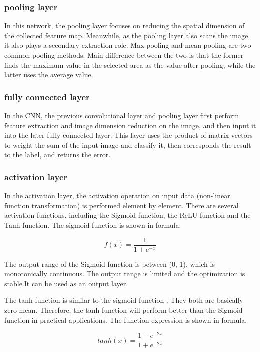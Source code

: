\subsubsection{pooling layer}
In this network, the pooling layer focuses on reducing the spatial dimension of the collected feature map. Meanwhile, as the pooling layer also scans the image, it also plays a secondary extraction role. 
Max-pooling and mean-pooling are two common pooling methods. 
Main difference between the two is that the former finds the maximum value in the selected area as the value after pooling, while the latter uses the average value.\cite{nagi2011max}

\subsubsection{fully connected layer}
In the CNN, the previous convolutional layer and pooling layer first perform feature extraction and image dimension reduction on the image, and then input it into the later fully connected layer. This layer uses the product of matrix vectors to weight the sum of the input image and classify it, then corresponds the result to the label, and returns the error.

\subsubsection{activation layer}

In the activation layer, the activation operation on input data (non-linear function transformation) is performed element by element.\cite{gomes2004comparison} There are several activation functions, including the Sigmoid function, the ReLU function and the Tanh function. The sigmoid function is shown in formula.


\begin{equation}
	f(x)=\frac{1}{1+e^{-x}}
\end{equation}	
 
The output range of the Sigmoid function is between (0, 1), which is monotonically continuous. The output range is limited  and the optimization is stable.It can be used as an output layer.


The tanh function is similar to the sigmoid function . They both are basically zero mean. Therefore, the tanh function will perform better than the Sigmoid function in practical applications. The function expression is shown in formula.


\begin{equation}
	tanh(x)=\frac{1-e^{-2x}}{1+e^{-2x}}
\end{equation}	

